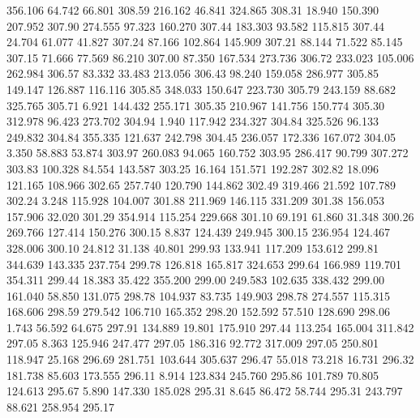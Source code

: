  356.106   64.742   66.801       308.59
 216.162   46.841  324.865       308.31
  18.940  150.390  207.952       307.90
 274.555   97.323  160.270       307.44
 183.303   93.582  115.815       307.44
  24.704   61.077   41.827       307.24
  87.166  102.864  145.909       307.21
  88.144   71.522   85.145       307.15
  71.666   77.569   86.210       307.00
  87.350  167.534  273.736       306.72
 233.023  105.006  262.984       306.57
  83.332   33.483  213.056       306.43
  98.240  159.058  286.977       305.85
 149.147  126.887  116.116       305.85
 348.033  150.647  223.730       305.79
 243.159   88.682  325.765       305.71
   6.921  144.432  255.171       305.35
 210.967  141.756  150.774       305.30
 312.978   96.423  273.702       304.94
   1.940  117.942  234.327       304.84
 325.526   96.133  249.832       304.84
 355.335  121.637  242.798       304.45
 236.057  172.336  167.072       304.05
   3.350   58.883   53.874       303.97
 260.083   94.065  160.752       303.95
 286.417   90.799  307.272       303.83
 100.328   84.554  143.587       303.25
  16.164  151.571  192.287       302.82
  18.096  121.165  108.966       302.65
 257.740  120.790  144.862       302.49
 319.466   21.592  107.789       302.24
   3.248  115.928  104.007       301.88
 211.969  146.115  331.209       301.38
 156.053  157.906   32.020       301.29
 354.914  115.254  229.668       301.10
  69.191   61.860   31.348       300.26
 269.766  127.414  150.276       300.15
   8.837  124.439  249.945       300.15
 236.954  124.467  328.006       300.10
  24.812   31.138   40.801       299.93
 133.941  117.209  153.612       299.81
 344.639  143.335  237.754       299.78
 126.818  165.817  324.653       299.64
 166.989  119.701  354.311       299.44
  18.383   35.422  355.200       299.00
 249.583  102.635  338.432       299.00
 161.040   58.850  131.075       298.78
 104.937   83.735  149.903       298.78
 274.557  115.315  168.606       298.59
 279.542  106.710  165.352       298.20
 152.592   57.510  128.690       298.06
   1.743   56.592   64.675       297.91
 134.889   19.801  175.910       297.44
 113.254  165.004  311.842       297.05
   8.363  125.946  247.477       297.05
 186.316   92.772  317.009       297.05
 250.801  118.947   25.168       296.69
 281.751  103.644  305.637       296.47
  55.018   73.218   16.731       296.32
 181.738   85.603  173.555       296.11
   8.914  123.834  245.760       295.86
 101.789   70.805  124.613       295.67
   5.890  147.330  185.028       295.31
   8.645   86.472   58.744       295.31
 243.797   88.621  258.954       295.17
